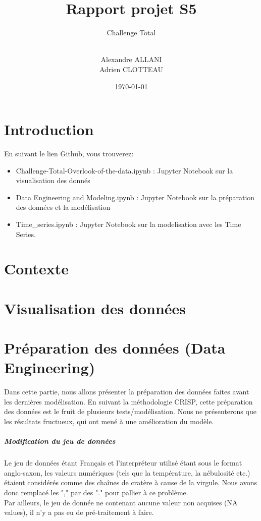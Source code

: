 \documentclass{article} %
\author{\\ Alexandre ALLANI \\
	Adrien CLOTTEAU }
\date{\noexpand\today} %
\title{Rapport projet S5}
\subtitle{Challenge Total}
\begin{document}
	
\imtaMaketitlepage
\tableofcontents
\newpage

\section{Introduction}
En suivant le lien Github, vous trouverez: 
\begin{itemize}
	\item Challenge-Total-Overlook-of-the-data.ipynb : Jupyter Notebook sur la visualisation des donnés
	\item Data Engineering and Modeling.ipynb : Jupyter Notebook sur la préparation des données et la modélisation
	\item Time\_series.ipynb : Jupyter Notebook sur la modelisation avec les Time Series.
\end{itemize}
\section{Contexte}
\newpage
\section{Visualisation des données}
\newpage
\section{Préparation des données (Data Engineering)}
Dans cette partie, nous allons présenter la préparation des données faites avant les dernières modélisation. En suivant la méthodologie CRISP, cette préparation des données est le fruit de plusieurs tests/modélisation. Nous ne présenterons que les résultats fructueux, qui ont mené à une amélioration du modèle.
\subparagraph{Modification du jeu de données}
Le jeu de données étant Français et l'interpréteur utilisé étant sous le format anglo-saxon, les valeurs numériques (tels que la température, la nébulosité etc.) étaient considérés comme des chaînes de cratère à cause de la virgule. Nous avons donc remplacé les "," par des "." pour pallier à ce problème.\\
Par ailleurs, le jeu de donnée ne contenant aucune valeur non acquises (NA values), il n'y a pas eu de pré-traitement à faire.
\end{document}
